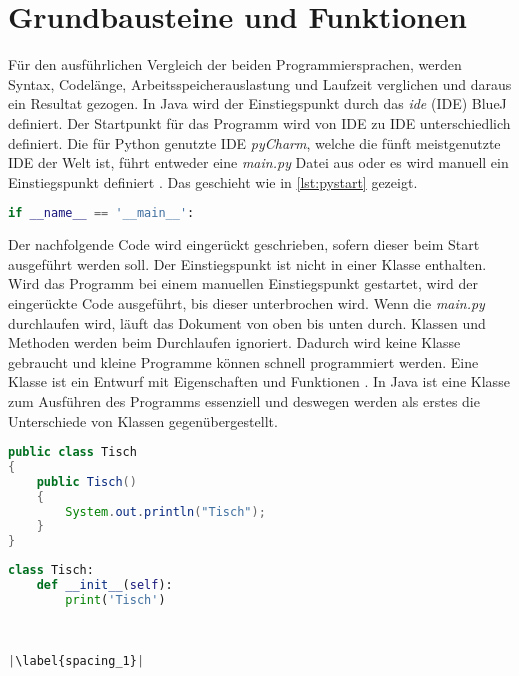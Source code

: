 \section{Grundbausteine und Funktionen}

Für den ausführlichen Vergleich der beiden Programmiersprachen, werden Syntax, Codelänge, Arbeitsspeicherauslastung und Laufzeit verglichen und daraus ein Resultat gezogen.
In Java wird der Einstiegspunkt durch das \textit{\acrlong{ide}} (IDE) BlueJ definiert. Der Startpunkt für das Programm wird von IDE zu IDE unterschiedlich definiert. Die für Python genutzte IDE \textit{pyCharm}, welche die fünft meistgenutzte IDE der Welt ist, führt entweder eine \textit{main.py} Datei aus oder es wird manuell ein Einstiegspunkt definiert \cite{Github:IDE}\cite{PyCharm}. Das geschieht wie in \ref{lst:pystart} gezeigt.

\begin{lstlisting}[language=python,caption={Einstiegspunkt Python},captionpos=b,label={lst:pystart},frame=none]
if __name__ == '__main__':
\end{lstlisting}

Der nachfolgende Code wird eingerückt geschrieben, sofern dieser beim Start ausgeführt werden soll. Der Einstiegspunkt ist nicht in einer Klasse enthalten. Wird das Programm bei einem manuellen Einstiegspunkt gestartet, wird der eingerückte Code ausgeführt, bis dieser unterbrochen wird. Wenn die \textit{main.py} durchlaufen wird, läuft das Dokument von oben bis unten durch. Klassen und Methoden werden beim Durchlaufen ignoriert. Dadurch wird keine Klasse gebraucht und kleine Programme können schnell programmiert werden. Eine Klasse ist ein Entwurf mit Eigenschaften und Funktionen \cite{gfg}. In Java ist eine Klasse zum Ausführen des Programms essenziell und deswegen werden als erstes die Unterschiede von Klassen gegenübergestellt.

\begin{minipage}{.5\linewidth}
\begin{lstlisting}[language=java,caption={Klasse in Java},captionpos=b,label={lst:java:class},frame=none]
public class Tisch
{
    public Tisch()
    {
        System.out.println("Tisch");
    }
}
\end{lstlisting}
\end{minipage}
\begin{minipage}{.5\linewidth}
\begin{lstlisting}[language=python,caption={Klasse in Python},captionpos=b,label={lst:python:class},frame=l,escapechar=|]
class Tisch:
    def __init__(self):
        print('Tisch')
        
        

|\label{spacing_1}|
\end{lstlisting}
\end{minipage}

